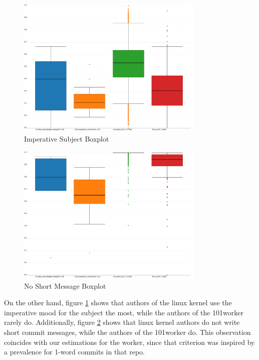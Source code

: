 \begin{figure}[p]
    \centering
    \includegraphics[width=0.8\textwidth]{img/imperative_subject.pdf}
    \caption{Imperative Subject Boxplot}
    \label{fig:bp_imperative_subject}
\end{figure}

\begin{figure}[p]
    \centering
    \includegraphics[width=0.8\textwidth]{img/no_short_message.pdf}
    \caption{No Short Message Boxplot}
    \label{fig:bp_no_short_message}
\end{figure}

On the other hand, figure \ref{fig:bp_imperative_subject} shows that authors of the linux kernel use the imperative mood for the subject the most, while the authors of the 101worker rarely do. Additionally, figure \ref{fig:bp_no_short_message} shows that linux kernel authors do not write short commit messages, while the authors of the 101worker do. This observation coincides with our estimations for the worker, since that criterion was inspired by a prevalence for 1-word commits in that repo.

